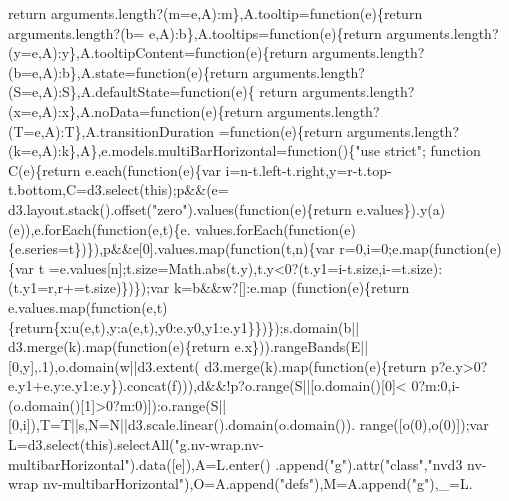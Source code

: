 \begin{DoxyCode}
{      return} arguments.length?(m=e,A):m\},A.tooltip=\textcolor{keyword}{function}(e)\{\textcolor{keywordflow}{return} arguments.length?(b=
      e,A):b\},A.tooltips=\textcolor{keyword}{function}(e)\{\textcolor{keywordflow}{return} arguments.length?(y=e,A):y\},A.tooltipContent=\textcolor{keyword}{function}(e)\{\textcolor{keywordflow}{return} 
      arguments.length?(b=e,A):b\},A.state=\textcolor{keyword}{function}(e)\{\textcolor{keywordflow}{return} arguments.length?(S=e,A):S\},A.defaultState=\textcolor{keyword}{function}(e)\{\textcolor{keywordflow}{
      return} arguments.length?(x=e,A):x\},A.noData=\textcolor{keyword}{function}(e)\{\textcolor{keywordflow}{return} arguments.length?(T=e,A):T\},A.transitionDuration
      =\textcolor{keyword}{function}(e)\{\textcolor{keywordflow}{return} arguments.length?(k=e,A):k\},A\},e.models.multiBarHorizontal=\textcolor{keyword}{function}()\{\textcolor{stringliteral}{"use strict"};\textcolor{keyword}{
      function} C(e)\{\textcolor{keywordflow}{return} e.each(\textcolor{keyword}{function}(e)\{var i=n-t.left-t.right,y=r-t.top-t.bottom,C=d3.select(\textcolor{keyword}{this});p&&(e=
      d3.layout.stack().offset(\textcolor{stringliteral}{"zero"}).values(\textcolor{keyword}{function}(e)\{\textcolor{keywordflow}{return} e.values\}).y(a)(e)),e.forEach(\textcolor{keyword}{function}(e,t)\{e.
      values.forEach(\textcolor{keyword}{function}(e)\{e.series=t\})\}),p&&e[0].values.map(\textcolor{keyword}{function}(t,n)\{var r=0,i=0;e.map(\textcolor{keyword}{function}(e)\{var t
      =e.values[n];t.size=Math.abs(t.y),t.y<0?(t.y1=i-t.size,i-=t.size):(t.y1=r,r+=t.size)\})\});var k=b&&w?[]:e.map
      (\textcolor{keyword}{function}(e)\{\textcolor{keywordflow}{return} e.values.map(\textcolor{keyword}{function}(e,t)\{\textcolor{keywordflow}{return}\{x:u(e,t),y:a(e,t),y0:e.y0,y1:e.y1\}\})\});s.domain(b||
      d3.merge(k).map(\textcolor{keyword}{function}(e)\{\textcolor{keywordflow}{return} e.x\})).rangeBands(E||[0,y],.1),o.domain(w||d3.extent(
      d3.merge(k).map(\textcolor{keyword}{function}(e)\{\textcolor{keywordflow}{return} p?e.y>0?e.y1+e.y:e.y1:e.y\}).concat(f))),d&&!p?o.range(S||[o.domain()[0]<
      0?m:0,i-(o.domain()[1]>0?m:0)]):o.range(S||[0,i]),T=T||s,N=N||d3.scale.linear().domain(o.domain()).
      range([o(0),o(0)]);var L=d3.select(\textcolor{keyword}{this}).selectAll(\textcolor{stringliteral}{"g.nv-wrap.nv-multibarHorizontal"}).data([e]),A=L.enter()
      .append(\textcolor{stringliteral}{"g"}).attr(\textcolor{stringliteral}{"class"},\textcolor{stringliteral}{"nvd3 nv-wrap nv-multibarHorizontal"}),O=A.append(\textcolor{stringliteral}{"defs"}),M=A.append(\textcolor{stringliteral}{"g"}),\_=L.

\end{DoxyCode}
